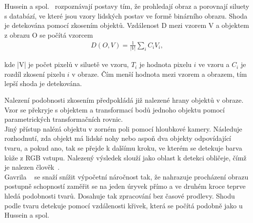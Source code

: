 Hussein a spol.~\cite{9} rozpoznávají postavy tím, že prohledají obraz a porovnají siluety s databází, ve které jsou vzory lidských postav ve formě binárního obrazu. Shoda je detekována pomocí zkosením objektů. Vzdálenost D mezi vzorem V a objektem z obrazu O se počítá vzorcem\\

\begin{eqnarray}
 D(O,V) = \frac{1}{|V|}\sum_{i}^{}C_{i}V_{i}   ,
\end{eqnarray}

kde |V| je počet pixelů v siluetě ve vzoru, $ T_{i} $ je hodnota pixelu $ i $ ve vzoru a $ C_{i} $ je rozdíl zkosení pixelu $ i $ v obraze. Čím menší hodnota mezi vzorem a obrazem, tím lepší shoda je detekována.

Nalezení podobnosti zkosením předpokládá již nalezené hrany objektů v obraze. Vzor se překryje s objektem a transformací bodů jednoho objektu pomocí parametrických transformačních rovnic.\\

Jiný přístup nalézá objektu v zorném poli pomocí hloubkové kamery. Následuje rozhodnutí, zda objekt má lidské nohy nebo aspoň dva objekty odpovídající tvaru, a pokud ano, tak se přejde k dalšímu kroku, ve kterém se detekuje barva kůže z RGB vstupu. Nalezený výsledek slouží jako oblast k detekci obličeje, čímž je nalezen člověk~\cite{10}.\\

Gavrila ~\cite{7} se snaží snížit výpočetní náročnost tak, že nahrazuje procházení obrazu postupně schopností zaměřit se na jeden úryvek přímo a ve druhém kroce teprve hledá podobnosti tvarů. Dosahuje tak zpracování bez časové prodlevy.
Shodu podle tvaru detekuje pomocí vzdálenosti křivek, která se počítá podobně jako u Hussein a spol.~\cite{9} 

